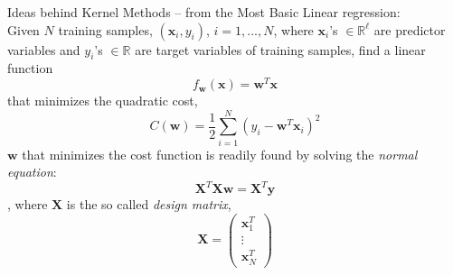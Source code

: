 \documentclass[aspectratio=169]{beamer}
\begin{document}
\begin{frame}{Ideas behind Kernel Methods -- from the Most Basic}
\scriptsize
Linear regression:\\
Given $N$ training samples, $(\mathbf{x}_i,y_i)$, $i=1,...,N$, where $\mathbf{x}_i$'s $\in\mathbb{R}^\ell$ are predictor variables and $y_i$'s $\in\mathbb{R}$ are target variables of training samples, find a linear function
\begin{equation}
  f_\mathbf{w}(\mathbf{x})=\mathbf{w}^T\mathbf{x}
\end{equation}
that minimizes the quadratic cost,
\begin{equation}
  C(\mathbf{w})=\frac{1}{2}\sum_{i=1}^{N}(y_i-\mathbf{w}^T\mathbf{x}_i)^2
\end{equation}
$\mathbf{w}$ that minimizes the cost function is readily found by solving the \emph{normal equation}:
\begin{equation}
  \mathbf{X}^T\mathbf{X}\mathbf{w}=\mathbf{X}^T\mathbf{y}
\end{equation}
, where $\mathbf{X}$ is the so called \emph{design matrix}, 
\begin{equation}
  \mathbf{X}=\begin{pmatrix}\mathbf{x}_1^T \\ \vdots \\ \mathbf{x}_N^T \end{pmatrix}
\end{equation}
\end{frame}
\end{document}
